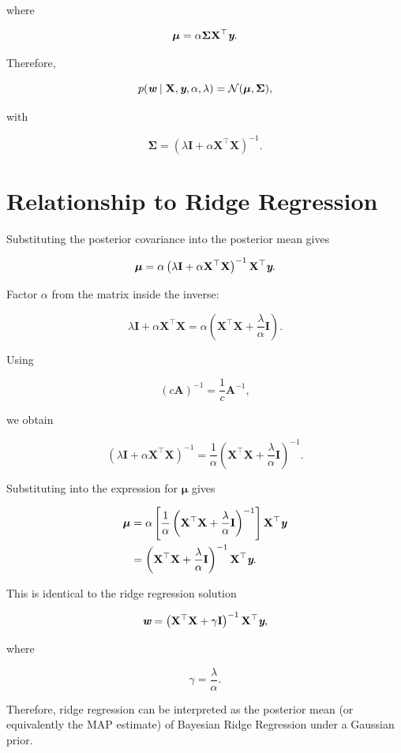 \documentclass[14pt]{extarticle}
\def\mathbi#1{\textbf{\em #1}}
\begin{document}
where

\[
\boldsymbol{\mu}
=
\alpha
\mathbf{\Sigma}
\mathbf{X}^{\top}
\mathbi{y}.
\]

Therefore,

\[
p(\mathbi{w}\mid\mathbf{X},\mathbi{y},\alpha,\lambda)
=
\mathcal{N}
(
\boldsymbol{\mu},
\mathbf{\Sigma}
),
\]

with

\[
\mathbf{\Sigma}
=
\left(
\lambda\mathbf{I}
+
\alpha\mathbf{X}^{\top}\mathbf{X}
\right)^{-1}.
\]

\section*{Relationship to Ridge Regression}

Substituting the posterior covariance into the posterior mean gives

\[
\boldsymbol{\mu}
=
\alpha
\left(
\lambda\mathbf{I}
+
\alpha\mathbf{X}^{\top}\mathbf{X}
\right)^{-1}
\mathbf{X}^{\top}
\mathbi{y}.
\]

Factor $\alpha$ from the matrix inside the inverse:

\[
\lambda\mathbf{I}
+
\alpha\mathbf{X}^{\top}\mathbf{X}
=
\alpha
\left(
\mathbf{X}^{\top}\mathbf{X}
+
\frac{\lambda}{\alpha}\mathbf{I}
\right).
\]

Using

\[
(c\mathbf{A})^{-1}
=
\frac{1}{c}
\mathbf{A}^{-1},
\]

we obtain

\[
\left(
\lambda\mathbf{I}
+
\alpha\mathbf{X}^{\top}\mathbf{X}
\right)^{-1}
=
\frac{1}{\alpha}
\left(
\mathbf{X}^{\top}\mathbf{X}
+
\frac{\lambda}{\alpha}\mathbf{I}
\right)^{-1}.
\]

Substituting into the expression for $\boldsymbol{\mu}$ gives

\begin{align*}
\boldsymbol{\mu}
&=
\alpha
\left[
\frac{1}{\alpha}
\left(
\mathbf{X}^{\top}\mathbf{X}
+
\frac{\lambda}{\alpha}\mathbf{I}
\right)^{-1}
\right]
\mathbf{X}^{\top}
\mathbi{y}\\
&=
\left(
\mathbf{X}^{\top}\mathbf{X}
+
\frac{\lambda}{\alpha}\mathbf{I}
\right)^{-1}
\mathbf{X}^{\top}
\mathbi{y}.
\end{align*}

This is identical to the ridge regression solution

\[
\mathbi{w}
=
\left(
\mathbf{X}^{\top}\mathbf{X}
+
\gamma\mathbf{I}
\right)^{-1}
\mathbf{X}^{\top}
\mathbi{y},
\]

where

\[
\gamma
=
\frac{\lambda}{\alpha}.
\]

Therefore, ridge regression can be interpreted as the posterior mean (or equivalently the MAP estimate) of Bayesian Ridge Regression under a Gaussian prior.
\end{document}
